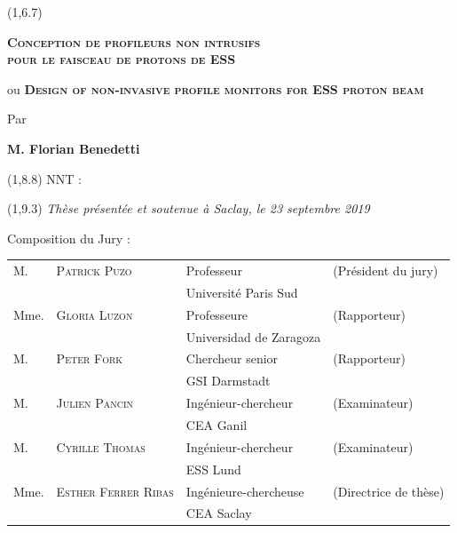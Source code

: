 \begin{titlepage}
	\begin{textblock}{14}(1,6.7)
		\begin{center}	
			\Large \textsc{\textcolor{ESSColor}{
					\textbf{Conception de profileurs non intrusifs \\pour le faisceau de protons de ESS}}}\par ou
			\Large \textsc{\textcolor{ESSColor}{ \textbf{Design of non-invasive profile monitors for ESS proton beam}}}\par          
			\large Par\par  \large \textbf{M. Florian Benedetti} \par
		\end{center}
	\end{textblock}
	
	\begin{textblock}{13}(1,8.8)
		NNT : 
	\end{textblock}
	
	\begin{textblock}{14}(1,9.3)
		\vspace{1.5cm}
		\hspace{1cm}\textit{Thèse présentée et soutenue à Saclay, le 23 septembre 2019}
		\vspace{0.5cm}
		\par
		\hspace{1cm}Composition du Jury :
		\begin{center}
			\begin{tabular}{llll}
				M.    & \textsc{Patrick Puzo}        & Professeur              & (Président du jury)    \\
				\null & \null                        & Université Paris Sud    &                        \\   
				
				Mme.  & \textsc{Gloria Luzon}        & Professeure             & (Rapporteur)           \\
				\null & \null                        & Universidad de Zaragoza &                        \\ 
				
				M.    & \textsc{Peter Fork}          & Chercheur senior        & (Rapporteur)           \\
				\null & \null                        & GSI Darmstadt           &                        \\ 
				M.    & \textsc{Julien Pancin}       & Ingénieur-chercheur     & (Examinateur)          \\
				\null & \null                        & CEA Ganil               &                        \\
				M.    & \textsc{Cyrille Thomas}      & Ingénieur-chercheur     & (Examinateur)          \\
				\null & \null                        & ESS Lund                &                        \\ 				
				Mme.  & \textsc{Esther Ferrer Ribas} & Ingénieure-chercheuse   & (Directrice de thèse)  \\
				\null & \null                        & CEA Saclay              &                        \\ 
				

\end{tabular}
\end{center}
\end{textblock}
\end{titlepage}
